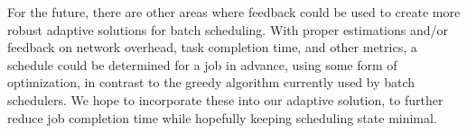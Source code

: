 \documentclass[10pt,conference,compsocconf,letterpaper]{IEEEtran}
\begin{document}
For the future, there are other areas where feedback could be used to create more robust
adaptive solutions for batch scheduling. With proper estimations and/or feedback on 
network overhead, task completion time, and other metrics, a schedule could be 
determined for a job in advance, using some form of optimization, in contrast to the 
greedy algorithm currently used by batch schedulers. We hope to incorporate these into
our adaptive solution, to further reduce job completion time while hopefully keeping
scheduling state minimal.





%
{}
%

\end{document}
